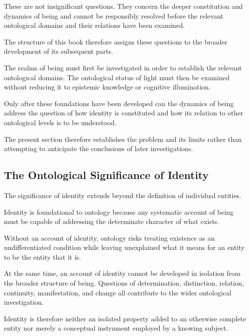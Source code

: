 These are not insignificant questions. They concern
the deeper constitution and dynamics of being and
cannot be responsibly resolved before the relevant
ontological domains and their relations have been
examined.

The structure of this book therefore assigns these
questions to the broader development of its
subsequent parts.

The realms of being must first be investigated in
order to establish the relevant ontological domains.
The ontological status of light must then be examined
without reducing it to epistemic knowledge or
cognitive illumination.

Only after these foundations have been developed
can the dynamics of being address the question of
how identity is constituted and how its relation
to other ontological levels is to be understood.

The present section therefore establishes the
problem and its limits rather than attempting to
anticipate the conclusions of later investigations.



\subsection{The Ontological Significance of Identity}
\label{subsec:ontological-significance-of-identity}

The significance of identity extends beyond the
definition of individual entities.

Identity is foundational to ontology because any
systematic account of being must be capable of
addressing the determinate character of what exists.

Without an account of identity, ontology risks
treating existence as an undifferentiated condition
while leaving unexplained what it means for an entity
to be the entity that it is.

At the same time, an account of identity cannot be
developed in isolation from the broader structure
of being. Questions of determination, distinction,
relation, continuity, manifestation, and change
all contribute to the wider ontological investigation.

Identity is therefore neither an isolated property
added to an otherwise complete entity nor merely a
conceptual instrument employed by a knowing subject.

